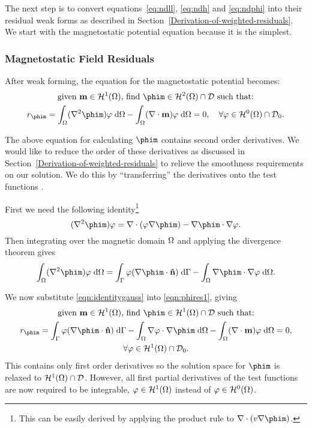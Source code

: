 The next step is to convert equations~\eqref{eq:ndll}, \eqref{eq:ndh} and \eqref{eq:ndphi} into their residual weak forms as described in Section~\ref{Derivation-of-weighted-residuals}.
We start with the magnetostatic potential equation because it is the simplest.

\subsubsection{Magnetostatic Field Residuals}
\label{sec:magn-field-resid}

After weak forming, the equation for the magnetostatic potential becomes:
\begin{gather}
  \text{given $\mv \in \sob^1(\magd)$, find $\phim \in \sob^2(\magd) \cap \Dfs$ such that:} \notag \\
  r_{\phim} = \int_\magd (\nabla^2 \phim) \tbf  \d \magd
  - \int_\magd (\nabla \cdot \mv) \tbf \d \magd = 0,
  \quad \forall \tbf \in \sob^0(\magd) \cap \Dfs_0. \label{eqn:phires1}
\end{gather}

The above equation for calculating $\phim$ contains second order derivatives.
We would like to reduce the order of these derivatives as discussed in Section~\ref{Derivation-of-weighted-residuals} to relieve the smoothness requirements on our solution.
We do this by ``transferring'' the derivatives onto the test functions \cite{HowardElmanDavidSilvester2006}.

First we need the following identity\footnote{This can be easily derived by applying the product rule to $\nabla \cdot (v \nabla \phim)$.}
\begin{equation}
  (\nabla^2 \phim) \tbf =
  \nabla \cdot (\tbf \nabla \phim)
  - \nabla \phim \cdot \nabla \tbf.
  \label{eq:20}
\end{equation}
Then integrating over the magnetic domain $\Omega$ and applying the divergence theorem gives
\begin{equation}
  \int_\magd (\nabla^2 \phim) \tbf \d \magd =
  \int_{\boundd} \tbf (\nabla \phim \cdot \nv) \d \boundd
  - \int_\magd \nabla \phim \cdot \nabla \tbf \d \magd.
  \label{eqn:identitygauss}
\end{equation}

We now substitute \eqref{eqn:identitygauss} into \eqref{eqn:phires1}, giving
\begin{gather}
   \text{given $\mv \in \sob^1(\magd)$, find $\phim \in \sob^1(\magd) \cap \Dfs$ such that:} \notag \\
  r_{\phim} = \int_{\boundd} \tbf (\nabla \phim \cdot \nv) \d \boundd
  - \int_\magd \nabla \tbf \cdot \nabla \phim \d \magd
  - \int_\magd (\nabla \cdot \mv) \tbf \d \magd = 0
  , \notag \\
  \forall \tbf \in \sob^1(\magd) \cap \Dfs_0. \notag
\end{gather}
This contains only first order derivatives so the solution space for $\phim$ is relaxed to $\mathcal{H}^1(\Omega) \cap \mathcal{D}$. However, all first partial derivatives of the test functions are now required to be integrable, \ie $\varphi \in \mathcal{H}^1(\Omega)$ instead of $\varphi \in \mathcal{H}^0(\Omega)$.

